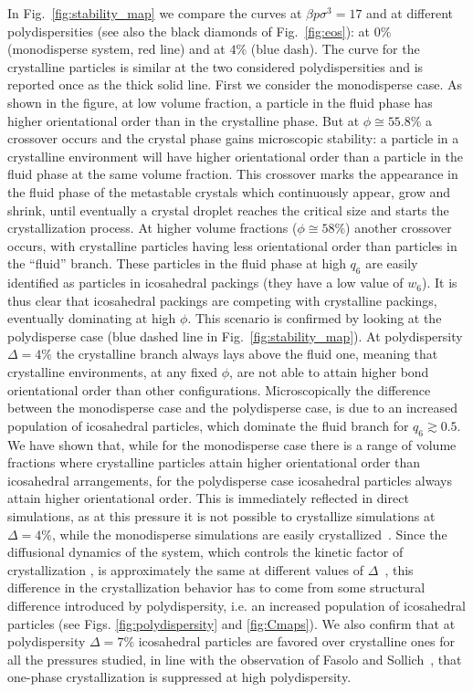 \documentclass[twocolumn,superscriptaddress]{revtex4}
\begin{document}
In Fig.~\ref{fig:stability_map}
we compare the curves at $\beta p\sigma^3=17$ and at different polydispersities (see also the black diamonds of Fig.~\ref{fig:eos}): 
at $0\%$ (monodisperse system, red line) and at $4\%$ (blue dash). The curve for the
crystalline particles is similar at the two considered polydispersities and is reported once
as the thick solid line. First we consider the monodisperse case. As shown in the figure,
at low volume fraction, a particle in the fluid phase has higher orientational order than in the crystalline phase.
But at $\phi\cong 55.8\%$ a crossover
occurs and the crystal phase gains microscopic stability: a particle in a crystalline environment will
have higher orientational order than a particle in the fluid phase at the same volume fraction.
This crossover marks the appearance in the fluid phase of the metastable crystals which continuously
appear, grow and shrink, until eventually a crystal droplet reaches the critical size and starts the
crystallization process.
At higher volume fractions ($\phi\cong 58\%$) another crossover occurs, with
crystalline particles having less orientational order than particles in the ``fluid'' branch.
These particles in the fluid phase at high $q_6$ are easily identified as particles in icosahedral packings (they have
a low value of $w_6$).
It is thus clear that icosahedral packings are competing with crystalline packings, eventually dominating
at high $\phi$. This scenario is confirmed by looking at the polydisperse case (blue dashed line in
Fig.~\ref{fig:stability_map}).
At polydispersity $\Delta=4\%$ the crystalline branch always lays above the fluid one, meaning that
crystalline environments, at any fixed $\phi$, are not able to attain higher bond orientational order than other configurations.
Microscopically the difference between the monodisperse case and the polydisperse case, is due to an increased population of icosahedral particles, which dominate the fluid branch for $q_6\gtrsim 0.5$.
We have shown that, while for the monodisperse case there is a range of volume fractions where crystalline particles
attain higher orientational order than icosahedral arrangements, for the polydisperse case icosahedral
particles always attain higher orientational order.
This is immediately reflected in direct simulations,
as at this pressure it is not possible to crystallize simulations at $\Delta=4\%$, while the
monodisperse simulations are easily crystallized~\cite{zaccarelli,pusey2009hard}. Since the diffusional dynamics of the
system, which controls the kinetic factor of crystallization \cite{TanakaK}, 
is approximately the same at different values of $\Delta$~\cite{zaccarelli}, this difference in the crystallization behavior has to come from
some structural difference introduced by polydispersity, i.e. an increased population of icosahedral particles (see Figs. \ref{fig:polydispersity} and \ref{fig:Cmaps}).
We also confirm that at polydispersity $\Delta=7\%$ icosahedral particles are favored over crystalline ones for
all the pressures studied, in line with the observation of Fasolo and Sollich~\cite{fasolo2004fractionation}, that
one-phase crystallization is suppressed at high polydispersity.
\end{document}
